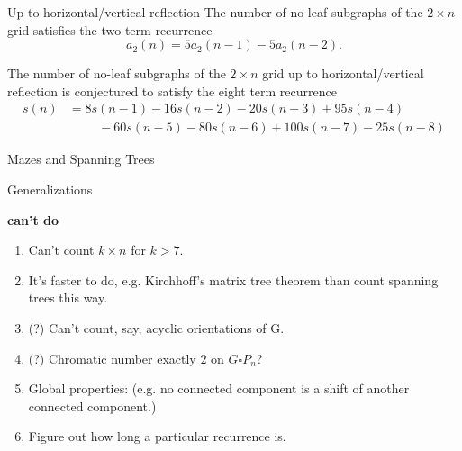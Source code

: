 \documentclass{beamer}%
\begin{document}
\begin{frame}{Up to horizontal/vertical reflection} %
  The number of no-leaf subgraphs of the $2 \times n$ grid satisfies the two
  term recurrence \[
    a_2(n) = 5a_2(n-1) - 5a_2(n-2).
  \]

  The number of no-leaf subgraphs of the $2 \times n$ grid up to
  horizontal/vertical reflection is conjectured to satisfy the eight term
  recurrence
  \begin{align*}
    s(n) &= 8s(n-1) - 16s(n-2) - 20s(n-3) + 95s(n-4) \\
         &\hspace{1cm}- 60s(n-5) - 80s(n-6) + 100s(n-7) - 25s(n-8)
  \end{align*}
  
\end{frame}

\begin{frame}{Mazes and Spanning Trees}
  
\end{frame}

\begin{frame}{Generalizations}

  \textbf{can't do}
  \begin{enumerate}
    \item Can't count $k \times n$ for $k > 7$.
    \item It's faster to do, e.g. Kirchhoff's matrix tree theorem than count spanning trees this way.
    \item (?) Can't count, say, acyclic orientations of G.
    \item (?) Chromatic number exactly $2$ on $G \square P_n$?
    \item Global properties: (e.g. no connected component is a shift of another connected component.)
    \item Figure out how long a particular recurrence is.
  \end{enumerate}

\end{frame}
\end{document}

